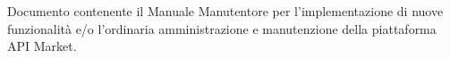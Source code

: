 Documento contenente il Manuale Manutentore per l'implementazione di nuove funzionalità e/o l'ordinaria amministrazione e manutenzione della piattaforma API Market.
